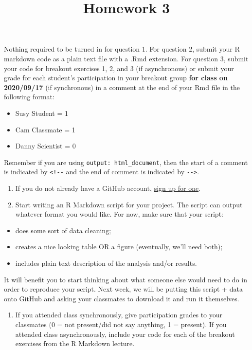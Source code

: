 \documentclass[]{article}
\title{Homework 3}
\author{}
\date{\vspace{-2.5em}}
\providecommand{\tightlist}{%
  \setlength{\itemsep}{0pt}\setlength{\parskip}{0pt}}
\begin{document}
\maketitle

Nothing required to be turned in for question 1. For question 2, submit
your R markdown code as a plain text file with a .Rmd extension. For
question 3, submit your code for breakout exercises 1, 2, and 3 (if
asynchronous) or submit your grade for each student's participation in
your breakout group \textbf{for class on 2020/09/17} (if synchronous) in
a comment at the end of your Rmd file in the following format:

\begin{itemize}
\tightlist
\item
  Susy Student = 1
\item
  Cam Classmate = 1
\item
  Danny Scientist = 0
\end{itemize}

Remember if you are using \texttt{output:\ html\_document}, then the
start of a comment is indicated by \texttt{\textless{}!-\/-} and the end
of comment is indicated by \texttt{-\/-\textgreater{}}.

\begin{enumerate}
\def\labelenumi{\arabic{enumi}.}
\item
  If you do not already have a GitHub account,
  \href{https://github.com/}{sign up for one}.
\item
  Start writing an R Markdown script for your project. The script can
  output whatever format you would like. For now, make sure that your
  script:
\end{enumerate}

\begin{itemize}
\tightlist
\item
  does some sort of data cleaning;
\item
  creates a nice looking table OR a figure (eventually, we'll need
  both);
\item
  includes plain text description of the analysis and/or results.
\end{itemize}

It will benefit you to start thinking about what someone else would need
to do in order to reproduce your script. Next week, we will be putting
this script + data onto GitHub and asking your classmates to download it
and run it themselves.

\begin{enumerate}
\def\labelenumi{\arabic{enumi}.}
\setcounter{enumi}{2}
\tightlist
\item
  If you attended class synchronously, give participation grades to your
  classmates (0 = not present/did not say anything, 1 = present). If you
  attended class asynchronously, include your code for each of the
  breakout exercises from the R Markdown lecture.
\end{enumerate}
\end{document}
